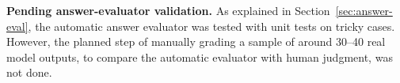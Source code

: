 \textbf{Pending answer-evaluator validation.} As explained in
Section~\ref{sec:answer-eval}, the automatic answer evaluator was tested with
unit tests on tricky cases. However, the planned step of manually grading
a sample of around 30--40 real model outputs, to compare the automatic
evaluator with human judgment, was not done.
